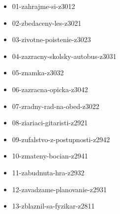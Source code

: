



\begin{itemize}
\item 01-zahrajme-si-z3012
\item 02-zbedaceny-les-z3021
\item 03-zivotne-poistenie-z3023
\item 04-zazracny-skolsky-autobus-z3031
\item 05-znamka-z3032
\item 06-zazracna-opicka-z3042
\item 07-zradny-rad-na-obed-z3022
\item 08-ziariaci-gitaristi-z2921
\item 09-zufalstvo-z-postupnosti-z2942
\item 10-zmateny-bocian-z2941
\item 11-zabudnuta-hra-z2932
\item 12-zavadzame-planovanie-z2931
\item 13-zblaznil-sa-fyzikar-z2811
\end{itemize}

